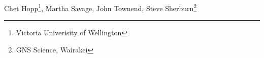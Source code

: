 Chet Hopp\footnote{Victoria Univerisity of Wellington}, Martha Savage\footnotemark[1], John Townend\footnotemark[1], Steve Sherburn\footnote{GNS Science, Wairakei}